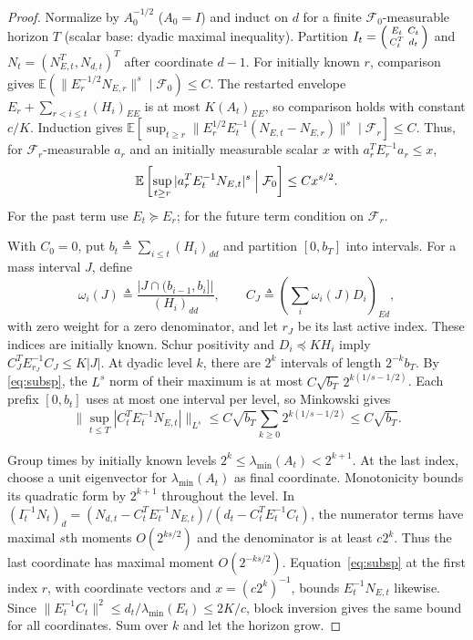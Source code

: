 \documentclass[11pt,reqno]{amsart}
\numberwithin{equation}{section}
\theoremstyle{definition}
\theoremstyle{remark}
\newcommand{\E}{\mathbb E}
\newcommand{\F}{\mathcal F}
\begin{document}
\begin{proof}
Normalize by $A_0^{-1/2}$ ($A_0=I$) and induct on $d$ for a finite $\F_0$-measurable horizon $T$ (scalar base: dyadic maximal inequality). Partition $I_t=\begin{psmallmatrix}E_t&C_t\\C_t^T&d_t\end{psmallmatrix}$ and $N_t=(N_{E,t}^T,N_{d,t})^T$ after coordinate $d-1$. For initially known $r$, comparison gives
$\E(\|E_r^{-1/2}N_{E,r}\|^s\mid\F_0)\le C$.
The restarted envelope $E_r+\sum_{r<i\le t}(H_i)_{EE}$ is at most
$K(A_t)_{EE}$, so comparison holds with constant $c/K$. Induction gives
$\E[\sup_{t\ge r}\|E_r^{1/2}E_t^{-1}(N_{E,t}-N_{E,r})\|^s\mid\F_r]\le C$.
Thus, for $\F_r$-measurable $a_r$ and an initially measurable scalar $x$ with
$a_r^T E_r^{-1}a_r\le x$,
\begin{equation}\label{eq:subsp}
 \E\left[\sup_{t\ge r}|a_r^T E_t^{-1}N_{E,t}|^s\Bigm|\F_0\right]
 \le Cx^{s/2}.
\end{equation}
For the past term use $E_t\succeq E_r$; for the future term condition on $\F_r$.

With $C_0=0$, put $b_t\triangleq\sum_{i\le t}(H_i)_{dd}$ and partition $[0,b_T]$ into intervals. For a mass interval $J$, define
\[
 \omega_i(J)\triangleq\frac{|J\cap(b_{i-1},b_i]|}{(H_i)_{dd}},\qquad
 C_J\triangleq\left(\sum_i\omega_i(J)D_i\right)_{Ed},
\]
with zero weight for a zero denominator, and let $r_J$ be its last active index. These indices are initially known.
Schur positivity and $D_i\preceq KH_i$ imply
$C_J^T E_{r_J}^{-1}C_J\le K|J|$.
At dyadic level $k$, there are $2^k$ intervals of length $2^{-k}b_T$. By \eqref{eq:subsp}, the $L^s$ norm of their maximum is at most $C\sqrt{b_T}\,2^{k(1/s-1/2)}$. Each prefix $[0,b_t]$ uses at most one interval per level, so Minkowski gives
\[
 \bigl\|\sup_{t\le T}|C_t^T E_t^{-1}N_{E,t}|\bigr\|_{L^s}
 \le C\sqrt{b_T}\sum_{k\ge0}2^{k(1/s-1/2)}\le C\sqrt{b_T}.
\]


Group times by initially known levels $2^k\le\lambda_{\min}(A_t)<2^{k+1}$. At the last index, choose a unit eigenvector for $\lambda_{\min}(A_t)$ as final coordinate. Monotonicity bounds its quadratic form by $2^{k+1}$ throughout the level. In $(I_t^{-1}N_t)_d=(N_{d,t}-C_t^TE_t^{-1}N_{E,t})/(d_t-C_t^TE_t^{-1}C_t)$, the numerator terms have maximal $s$th moments $O(2^{ks/2})$ and the denominator is at least $c2^k$. Thus the last coordinate has maximal moment $O(2^{-ks/2})$. Equation~\eqref{eq:subsp} at the first index $r$, with coordinate vectors and $x=(c2^k)^{-1}$, bounds $E_t^{-1}N_{E,t}$ likewise. Since $\|E_t^{-1}C_t\|^2\le d_t/\lambda_{\min}(E_t)\le2K/c$, block inversion gives the same bound for all coordinates. Sum over $k$ and let the horizon grow.
\end{proof}
\end{document}
